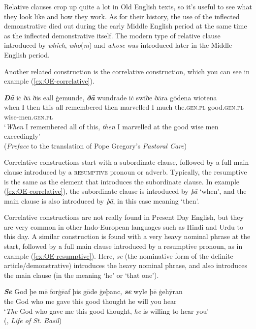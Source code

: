 \noindent Relative clauses crop up quite a lot in Old English texts, so it's useful to see what they look like and how they work. As for their history, the use of the inflected demonstrative died out during the early Middle English period at the same time as the inflected demonstrative itself. The modern type of relative clause introduced by \emph{which}, \emph{who}(\emph{m}) and \emph{whose} was introduced later in the Middle English period.

Another related construction is the correlative construction, which you can see in example (\ref{ex:OE-correlative}).

\begin{exe}
    \ex\label{ex:OE-correlative}
    \gll \emph{\textbf{Ðā}} iċ ðā ðis eall ġemunde, \emph{\textbf{ðā}} wundrade iċ swīðe ðāra gōdena wiotena\\
    when I then this all remembered then marvelled I much the.\textsc{gen.pl} good.\textsc{gen.pl} wise-men.\textsc{gen.pl}\\
    \trans `\emph{When} I remembered all of this, \emph{then} I marvelled at the good wise men exceedingly'\\
    (\emph{Preface} to the translation of Pope Gregory's \emph{Pastoral Care})
\end{exe}

\noindent Correlative constructions start with a subordinate clause, followed by a full main clause introduced by a \textsc{resumptive} pronoun or adverb. Typically, the resumptive is the same as the element that introduces the subordinate clause. In example (\ref{ex:OE-correlative}), the subordinate clause is introduced by \emph{þā} `when', and the main clause is also introduced by \emph{þā}, in this case meaning `then'.

Correlative constructions are not really found in Present Day English, but they are very common in other Indo-European languages such as Hindi and Urdu to this day. A similar construction is found with a very heavy nominal phrase at the start, followed by a full main clause introduced by a resumptive pronoun, as in example (\ref{ex:OE-resumptive}). Here, \emph{se} (the nominative form of the definite article/demonstrative) introduces the heavy nominal phrase, and also introduces the main clause (in the meaning `he' or `that one').

\begin{exe}
    \ex\label{ex:OE-resumptive}
    \gll \emph{\textbf{Se}} God þe mē forġēaf þis gōde ġeþanc, \emph{\textbf{se}} wyle þē ġehȳran\\
    the God who me gave this good thought he will you hear\\
    \trans `\emph{The} God who gave me this good thought, \emph{he} is willing to hear you'\\
    (, \emph{Life of St. Basil})
\end{exe}

